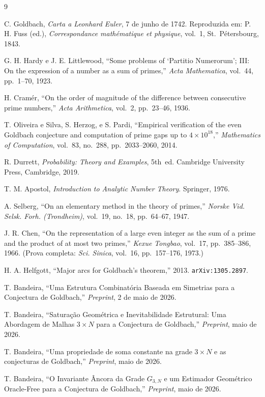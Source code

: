 \documentclass[12pt,a4paper]{article}
\theoremstyle{remark}
\begin{document}
	\begin{thebibliography}{9}
		
		C. Goldbach,
		\emph{Carta a Leonhard Euler}, 7 de junho de 1742.
		Reproduzida em: P. H. Fuss (ed.),
		\emph{Correspondance math\'ematique et physique}, vol.~1,
		St.~P\'etersbourg, 1843.
		
		G. H. Hardy e J. E. Littlewood,
		``Some problems of `Partitio Numerorum'; III: On the expression of
		a number as a sum of primes,''
		\emph{Acta Mathematica}, vol.~44, pp.~1--70, 1923.
		
		H. Cram\'er,
		``On the order of magnitude of the difference between consecutive prime numbers,''
		\emph{Acta Arithmetica}, vol.~2, pp.~23--46, 1936.
		
		T. Oliveira e Silva, S. Herzog, e S. Pardi,
		``Empirical verification of the even Goldbach conjecture and computation of prime gaps
		up to $4\times 10^{18}$,''
		\emph{Mathematics of Computation}, vol.~83, no.~288, pp.~2033--2060, 2014.
		
		R. Durrett,
		\emph{Probability: Theory and Examples}, 5th~ed.
		Cambridge University Press, Cambridge, 2019.
		
		T. M. Apostol,
		\emph{Introduction to Analytic Number Theory}.
		Springer, 1976.
		
		A. Selberg,
		``On an elementary method in the theory of primes,''
		\emph{Norske Vid. Selsk. Forh. (Trondheim)}, vol.~19, no.~18, pp.~64--67, 1947.
		
		J. R. Chen,
		``On the representation of a large even integer as the sum of a prime and the product
		of at most two primes,''
		\emph{Kexue Tongbao}, vol.~17, pp.~385--386, 1966.
		(Prova completa: \emph{Sci. Sinica}, vol.~16, pp.~157--176, 1973.)
		
		H. A. Helfgott,
		``Major arcs for Goldbach's theorem,'' 2013.
		\texttt{arXiv:1305.2897}.
		
		T. Bandeira,
		``Uma Estrutura Combinat\'oria Baseada em Simetrias para a Conjectura de Goldbach,''
		\emph{Preprint}, 2 de maio de 2026.
		
		T. Bandeira,
		``Satura\c{c}\~ao Geom\'etrica e Inevitabilidade Estrutural:
		Uma Abordagem de Malhas $3\times N$ para a Conjectura de Goldbach,''
		\emph{Preprint}, maio de 2026.
		
		T. Bandeira,
		``Uma propriedade de soma constante na grade $3\times N$ e as conjecturas
		de Goldbach,''
		\emph{Preprint}, maio de 2026.
		
		T. Bandeira,
		``O Invariante \^Ancora da Grade $G_{3,N}$ e um Estimador Geom\'etrico
		Oracle-Free para a Conjectura de Goldbach,''
		\emph{Preprint}, maio de 2026.
		
	\end{thebibliography}
	
\end{document}
